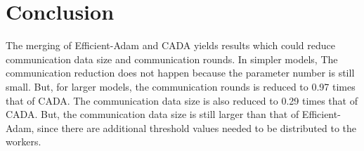 \section{Conclusion}
The merging of Efficient-Adam and CADA yields results which could reduce communication data size and communication rounds. In simpler models, The communication reduction does not happen because the parameter number is still small. But, for larger models, the communication rounds is reduced to 0.97 times that of CADA. The communication data size is also reduced to 0.29 times that of CADA. But, the communication data size is still larger than that of Efficient-Adam, since there are additional threshold values needed to be distributed to the workers.
